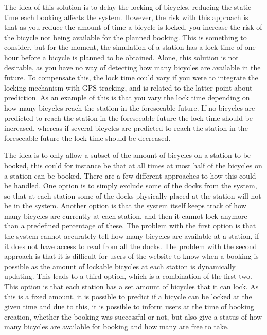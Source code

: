 \begin{description}[style=nextline]
		\item[Lock late]
		The idea of this solution is to delay the locking of bicycles, reducing the static time each booking affects the system.
		However, the risk with this approach is that as you reduce the amount of time a bicycle is locked, you increase the risk of the bicycle not being available for the planned booking.
		This is something to consider, but for the moment, the simulation of a station has a lock time of one hour before a bicycle is planned to be obtained.
		Alone, this solution is not desirable, as you have no way of detecting how many bicycles are available in the future.
		To compensate this, the lock time could vary if you were to integrate the locking mechanism with GPS tracking, and is related to the latter point about prediction.
		As an example of this is that you vary the lock time depending on how many bicycles reach the station in the foreseeable future. 
		If no bicycles are predicted to reach the station in the foreseeable future the lock time should be increased, whereas if several bicycles are predicted to reach the station in the foreseeable future the lock time should be decreased.
		
		\item[Subset of bicycles for booking]
		The idea is to only allow a subset of the amount of bicycles on a station to be booked, this could for instance be that at all times at most half of the bicycles on a station can be booked.
		There are a few different approaches to how this could be handled.
		One option is to simply exclude some of the docks from the system, so that at each station some of the docks physically placed at the station will not be in the system.
		Another option is that the system itself keeps track of how many bicycles are currently at each station, and then it cannot lock anymore than a predefined percentage of these.
		The problem with the first option is that the system cannot accurately tell how many bicycles are available at a station, if it does not have access to read from all the docks.
		The problem with the second approach is that it is difficult for users of the website to know when a booking is possible as the amount of lockable bicycles at each station is dynamically updating.
		This leads to a third option, which is a combination of the first two.
		This option is that each station has a set amount of bicycles that it can lock.
		As this is a fixed amount, it is possible to predict if a bicycle can be locked at the given time and due to this, it is possible to inform users at the time of booking creation, whether the booking was successful or not, but also give a status of how many bicycles are available for booking and how many are free to take.
		

\end{description}

